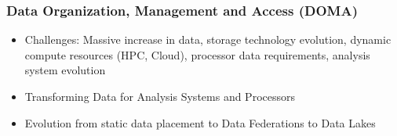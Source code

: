 \begin{frame}
\frametitle{Data Organization, Management and Access (DOMA)}

\begin{itemize}
\item Challenges: Massive increase in data, storage technology evolution, dynamic compute resources (HPC, Cloud), processor data requirements, analysis system evolution
\item Transforming Data for Analysis Systems and Processors
\item Evolution from static data placement to Data Federations to Data Lakes
\end{itemize}

\end{frame}


